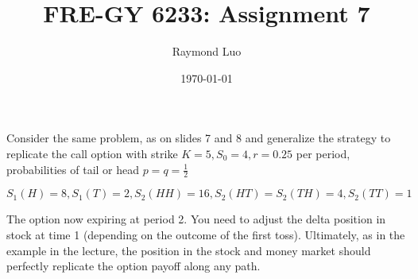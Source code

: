 \documentclass[12pt,twoside, letter]{exam}
\theoremstyle{definition}
\begin{document}
\abovedisplayskip=12pt
\belowdisplayskip=12pt
\abovedisplayshortskip=7pt
\belowdisplayshortskip=10pt
\allowdisplaybreaks

\setlength{\parindent}{18pt}

\title{FRE-GY 6233: Assignment 7}
\author{Raymond Luo}
\date{\today}
\maketitle

  \par{Consider the same problem, as on slides 7 and 8 and generalize the strategy to replicate the call option with strike $K = 5,
  S_0 = 4, r = 0.25$ per period, probabilities of tail or head $p = q = \frac{1}{2}$}

\begin{equation*}
  S_1(H) = 8, S_1(T) = 2, S_2(HH) = 16, S_2(HT) = S_2(TH) = 4, S_2(TT) = 1
\end{equation*}

  \par{The option now expiring at period 2. You need to adjust the delta position in stock at time 1 (depending on the outcome of the
  first toss). Ultimately, as in the example in the lecture, the position in the stock and money market should perfectly replicate
  the option payoff along any path.}
  \\
\end{document}
